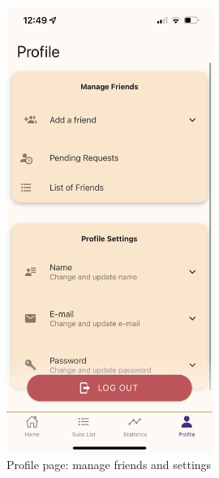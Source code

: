 \documentclass[12pt]{article}
\begin{document}
\begin{figure}[h!]
\begin{minipage}[c]{0.45\textwidth}
        \includegraphics[width=0.6\textwidth, clip]{../../assets/smartphone/profile.PNG}
        \caption{Profile page: manage friends and settings}
        \label{fig:profile}
    \end{minipage}
\end{figure}
\end{document}
